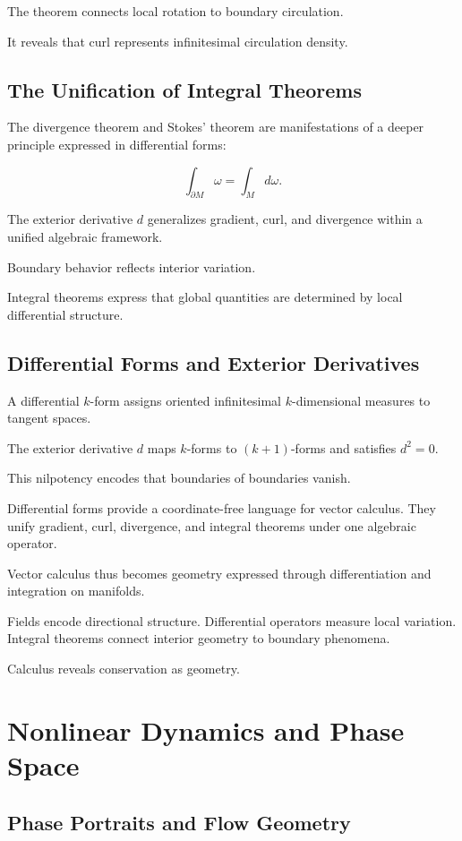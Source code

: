 \documentclass[12pt]{book}
\begin{document}
The theorem connects local rotation to boundary circulation.

It reveals that curl represents infinitesimal circulation density.

\section{The Unification of Integral Theorems}

The divergence theorem and Stokes' theorem are manifestations of a deeper principle expressed in differential forms:

\[
\int_{\partial M} \omega = \int_M d\omega.
\]

The exterior derivative $d$ generalizes gradient, curl, and divergence within a unified algebraic framework.

Boundary behavior reflects interior variation.

Integral theorems express that global quantities are determined by local differential structure.

\section{Differential Forms and Exterior Derivatives}

A differential $k$-form assigns oriented infinitesimal $k$-dimensional measures to tangent spaces.

The exterior derivative $d$ maps $k$-forms to $(k+1)$-forms and satisfies $d^2 = 0$.

This nilpotency encodes that boundaries of boundaries vanish.

Differential forms provide a coordinate-free language for vector calculus. They unify gradient, curl, divergence, and integral theorems under one algebraic operator.

Vector calculus thus becomes geometry expressed through differentiation and integration on manifolds.

Fields encode directional structure. Differential operators measure local variation. Integral theorems connect interior geometry to boundary phenomena.

Calculus reveals conservation as geometry.

\chapter{Nonlinear Dynamics and Phase Space}

\section{Phase Portraits and Flow Geometry}
\end{document}
